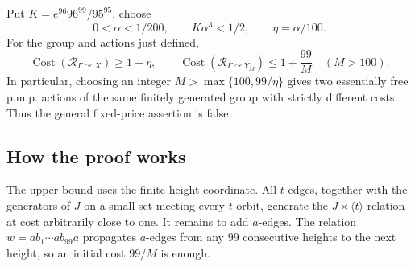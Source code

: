 \begin{theorem}\label{intro:main}
Put $K=e^{96}96^{99}/95^{95}$, choose
\[
 0<\alpha<1/200,\qquad K\alpha^3<1/2,
 \qquad \eta=\alpha/100.
\]
For the group and actions just defined,
\[
 \operatorname{Cost}(\mathcal R_{\Gamma\curvearrowright X})
      \ge1+\eta,
 \qquad
 \operatorname{Cost}(\mathcal R_{\Gamma\curvearrowright Y_M})
      \le1+\frac{99}{M}\quad(M>100).
\]
In particular, choosing an integer $M>\max\{100,99/\eta\}$ gives
two essentially free p.m.p. actions of the same finitely generated
group with strictly different costs. Thus the general fixed-price
assertion is false.
\end{theorem}

\subsection{How the proof works}

The upper bound uses the finite height coordinate. All $t$-edges,
together with the generators of $J$ on a small set meeting every
$t$-orbit, generate the $J\times\langle t\rangle$ relation at cost
arbitrarily close to one. It remains to add $a$-edges. The relation
$w=ab_1\cdots ab_{99}a$ propagates $a$-edges from any $99$
consecutive heights to the next height, so an initial cost $99/M$
is enough.

